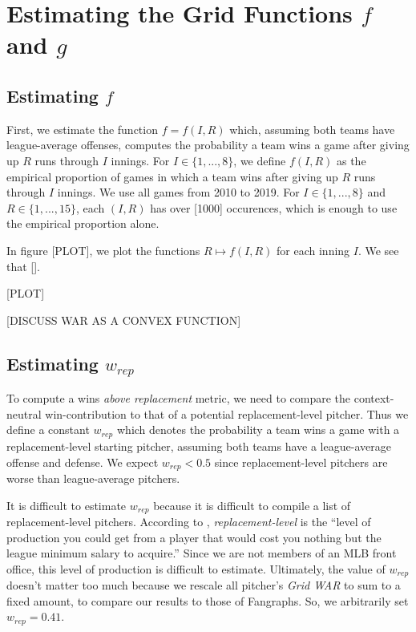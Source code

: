 \documentclass[12pt]{article}
\begin{document}
\section{Estimating the Grid Functions $f$ and $g$}

\subsection{Estimating $f$}

First, we estimate the function $f=f(I,R)$ which, assuming both teams have league-average offenses, computes the probability a team wins a game after giving up $R$ runs through $I$ innings. For $I \in \{1,...,8\}$, we define $f(I,R)$ as the empirical proportion of games in which a team wins after giving up $R$ runs through $I$ innings. We use all games from 2010 to 2019. For $I \in \{1,...,8\}$ and $R \in \{1,...,15\}$, each $(I,R)$ has over [1000] occurences, which is enough to use the empirical proportion alone.  

In figure [PLOT], we plot the functions $R \mapsto f(I,R)$ for each inning $I$. We see that [].

[PLOT]

[DISCUSS WAR AS A CONVEX FUNCTION]

\subsection{Estimating $w_{rep}$}

To compute a wins \textit{above replacement} metric, we need to compare the context-neutral win-contribution to that of a potential replacement-level pitcher. Thus we define a constant $w_{rep}$ which denotes the probability a team wins a game with a replacement-level starting pitcher, assuming both teams have a league-average offense and defense. We expect $w_{rep} < 0.5$ since replacement-level pitchers are worse than league-average pitchers. 

It is difficult to estimate $w_{rep}$ because it is difficult to compile a list of replacement-level pitchers. According to \citet{ReplacementLevel}, \textit{replacement-level} is the ``level of production you could get from a player that would cost you nothing but the league minimum salary to acquire.'' Since we are not members of an MLB front office, this level of production is difficult to estimate. Ultimately, the value of $w_{rep}$ doesn't matter too much because we rescale all pitcher's \textit{Grid WAR} to sum to a fixed amount, to compare our results to those of Fangraphs. So, we arbitrarily set $w_{rep} = 0.41$. 
\end{document}
